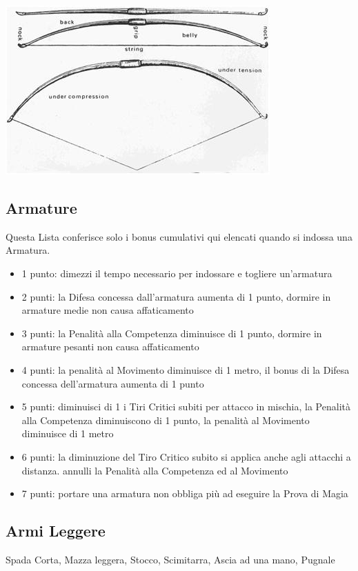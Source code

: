 \begin{multicols}{2}
\begin{center}
\includegraphics[width=0.7\linewidth]{immagini/arma-arco.png}
\end{center}

\subsection{Armature} \label{listaarmature}

Questa Lista conferisce solo i bonus cumulativi qui elencati quando si indossa una Armatura.

\begin{itemize}[leftmargin=*] \setlength{\itemsep}{0pt}

\item 1 punto: dimezzi il tempo necessario per indossare e togliere un'armatura
\item 2 punti: la Difesa concessa dall'armatura aumenta di 1 punto, dormire in armature medie non causa affaticamento
\item 3 punti: la Penalità alla Competenza diminuisce di 1 punto, dormire in armature pesanti non causa affaticamento
\item 4 punti: la penalità al Movimento diminuisce di 1 metro, il bonus di la Difesa concessa dell'armatura aumenta di 1 punto
\item 5 punti: diminuisci di 1 i Tiri Critici subiti per attacco in mischia, la Penalità alla Competenza diminuiscono di 1 punto, la penalità al Movimento diminuisce di 1 metro
\item 6 punti: la diminuzione del Tiro Critico subito si applica anche agli attacchi a distanza. annulli la Penalità alla Competenza ed al Movimento
\item 7 punti: portare una armatura non obbliga più ad eseguire la Prova di Magia
\end{itemize}

\subsection{Armi Leggere} Spada Corta, Mazza leggera, Stocco, Scimitarra, Ascia ad una mano, Pugnale\label{listaarmileggere}


\end{multicols}
